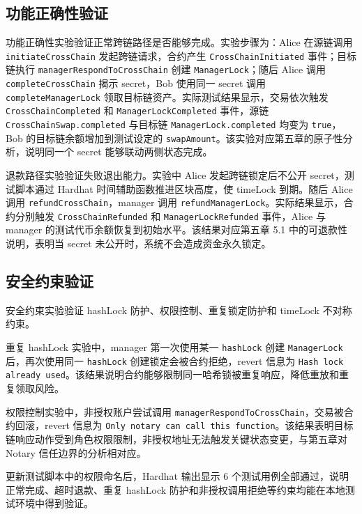 \subsection{功能正确性验证}


功能正确性实验验证正常跨链路径是否能够完成。实验步骤为：Alice 在源链调用 \texttt{initiateCrossChain} 发起跨链请求，合约产生 \texttt{CrossChainInitiated} 事件；目标链执行 \texttt{managerRespondToCrossChain} 创建 \texttt{ManagerLock}；随后 Alice 调用 \texttt{completeCrossChain} 揭示 secret，Bob 使用同一 secret 调用 \texttt{completeManagerLock} 领取目标链资产。实际测试结果显示，交易依次触发 \texttt{CrossChainCompleted} 和 \texttt{ManagerLockCompleted} 事件，源链 \texttt{CrossChainSwap.completed} 与目标链 \texttt{ManagerLock.completed} 均变为 \texttt{true}，Bob 的目标链余额增加到测试设定的 \texttt{swapAmount}。该实验对应第五章的原子性分析，说明同一个 secret 能够联动两侧状态完成。


退款路径实验验证失败退出能力。实验中 Alice 发起跨链锁定后不公开 secret，测试脚本通过 Hardhat 时间辅助函数推进区块高度，使 timeLock 到期。随后 Alice 调用 \texttt{refundCrossChain}，manager 调用 \texttt{refundManagerLock}。实际结果显示，合约分别触发 \texttt{CrossChainRefunded} 和 \texttt{ManagerLockRefunded} 事件，Alice 与 manager 的测试代币余额恢复到初始水平。该结果对应第五章 5.1 中的可退款性说明，表明当 secret 未公开时，系统不会造成资金永久锁定。


\subsection{安全约束验证}


安全约束实验验证 hashLock 防护、权限控制、重复锁定防护和 timeLock 不对称约束。

重复 hashLock 实验中，manager 第一次使用某一 \texttt{hashLock} 创建 \texttt{ManagerLock} 后，再次使用同一 \texttt{hashLock} 创建锁定会被合约拒绝，revert 信息为 \texttt{Hash lock already used}。该结果说明合约能够限制同一哈希锁被重复响应，降低重放和重复领取风险。

权限控制实验中，非授权账户尝试调用 \texttt{managerRespondToCrossChain}，交易被合约回滚，revert 信息为 \texttt{Only notary can call this function}。该结果表明目标链响应动作受到角色权限限制，非授权地址无法触发关键状态变更，与第五章对 Notary 信任边界的分析相对应。

更新测试脚本中的权限命名后，Hardhat 输出显示 6 个测试用例全部通过，说明正常完成、超时退款、重复 hashLock 防护和非授权调用拒绝等约束均能在本地测试环境中得到验证。

